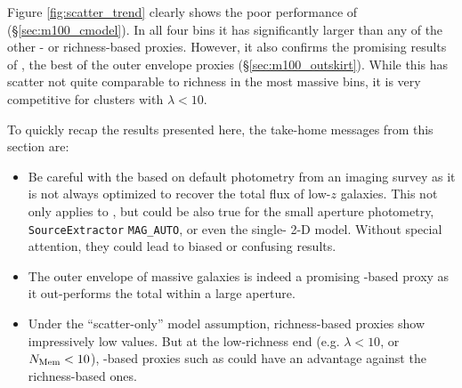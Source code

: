 \documentclass[fleqn,usenatbib,useAMS,english]{mnras}
\begin{document}
    Figure \ref{fig:scatter_trend} clearly shows the poor performance of \mcmodel{}
    (\S \ref{sec:m100_cmodel}).
    In all four bins it has \sigmvir{} significantly larger than any of the other
    \mstar- or richness-based proxies.
    However, it also confirms the promising results of , the best of the
    outer envelope proxies (\S \ref{sec:m100_outskirt}). While this has
    scatter not quite comparable to richness in the most massive bins, it is very competitive
    for clusters with $\lambda < 10$.


    To quickly recap the results presented here, the take-home messages from this section are:

    \begin{itemize}

        \item Be careful with the \mstar{} based on default photometry from an imaging survey
            as it is not always optimized to recover the total flux of low-$z$ galaxies. This not
            only applies to \cmodel{}, but could be also true for the small aperture photometry,
            \texttt{SourceExtractor} \texttt{MAG\_AUTO}, or even the single-\ser{} 2-D model.
            Without special attention, they could lead to biased or confusing results.

        \item The outer envelope of massive galaxies is indeed a promising \mstar{}-based
            \mvir{} proxy as it out-performs the total \mstar{} within a large aperture.

        \item Under the ``scatter-only'' model assumption, richness-based \mvir{} proxies
            show impressively low \sigmvir{} values.
            But at the low-richness end (e.g. $\lambda < 10$, or $N_{\rm Mem}<10$),
            \mstar{}-based proxies such as  could have an advantage against the
            richness-based ones.

    \end{itemize}
\end{document}
